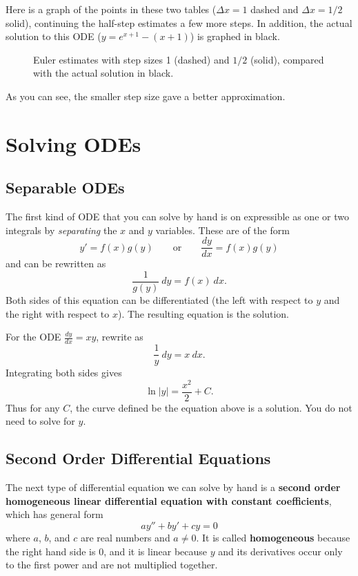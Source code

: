 \begin{exampleblock}[breakable]
Here is a graph of the points in these two tables ($\Delta x = 1$ dashed and $\Delta x = 1/2$ solid), continuing the half-step estimates a few more steps. In addition, the actual solution to this ODE ($y=e^{x+1}-(x+1)$) is graphed in black.
\begin{figure}[H]
\centering

\caption{Euler estimates with step sizes 1 (dashed) and $1/2$ (solid), compared with the actual solution in black.}
\label{fig:eulers-method}
\end{figure}
As you can see, the smaller step size gave a better approximation.
\end{exampleblock}


\clearpage
\section{Solving ODEs}
\label{sec:solving-odes}
\subsection{Separable ODEs}
The first kind of ODE that you can solve by hand is on expressible as one or two integrals by \textit{separating} the $x$ and $y$ variables. These are of the form
$$y'=f(x)g(y) \quad\quad\text{or}\quad\quad \frac{dy}{dx}=f(x)g(y)$$
and can be rewritten as
$$\frac{1}{g(y)}\ dy = f(x)\ dx.$$
Both sides of this equation can be differentiated (the left with respect to $y$ and the right with respect to $x$). The resulting equation is the solution.
\begin{exampleblock}
For the ODE $\frac{dy}{dx} = xy$, rewrite as
$$\frac{1}{y}\ dy = x\ dx.$$
Integrating both sides gives
$$\ln|y| = \frac{x^2}{2} + C.$$
Thus for any $C$, the curve defined be the equation above is a solution. You do not need to solve for $y$.
\end{exampleblock}

\subsection{Second Order Differential Equations}

The next type of differential equation we can solve by hand is a \textbf{second order homogeneous linear differential equation with constant coefficients}, which has general form
$$ay''+by'+cy=0$$
where $a$, $b$, and $c$ are real numbers and $a\ne 0$. It is called \textbf{homogeneous} because the right hand side is 0, and it is linear because $y$ and its derivatives occur only to the first power and are not multiplied together.

